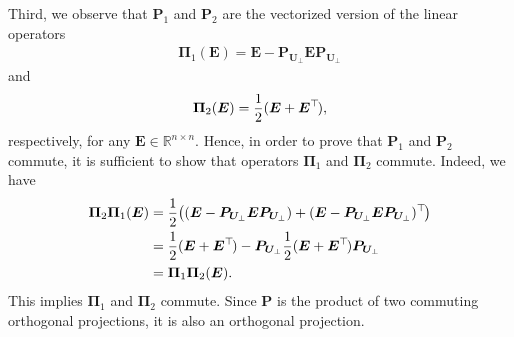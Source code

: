 \documentclass{article}
\def\R{{\mathbb R}}
\newcommand{\topnew}{\top \hspace{-0.05cm}}
\begin{document}
Third, we observe that $\bm P_1$ and $\bm P_2$ are the vectorized version of the linear operators
\begin{align*}
    \bm \Pi_1 (\bm E) = \bm E - \bm P_{\bm U_\perp} \bm E \bm P_{\bm U_\perp}
\end{align*}
and
\begin{align*}
    \bm \Pi_2 (\bm E) = \frac{1}{2} (\bm E + \bm E^\topnew) ,
\end{align*}
respectively, for any $\bm E \in \R^{n \times n}$. Hence, in order to prove that $\bm P_1$ and $\bm P_2$ commute, it is sufficient to show that operators $\bm \Pi_1$ and $\bm \Pi_2$ commute. Indeed, we have
\begin{align*}
    \bm \Pi_2 \bm \Pi_1 (\bm E) &= \frac{1}{2} \bigl( (\bm E - \bm P_{\bm U_\perp} \bm E \bm P_{\bm U_\perp}) + (\bm E - \bm P_{\bm U_\perp} \bm E \bm P_{\bm U_\perp})^\topnew \bigr) \\
    &= \frac{1}{2} (\bm E + \bm E^\topnew) - \bm P_{\bm U_\perp} \frac{1}{2} (\bm E + \bm E^\topnew) \bm P_{\bm U_\perp} \\
    &= \bm \Pi_1 \bm \Pi_2 (\bm E) .
\end{align*}
This implies $\bm \Pi_1$ and $\bm \Pi_2$ commute.
Since $\bm P$ is the product of two commuting orthogonal projections, it is also an orthogonal projection.
\end{document}

